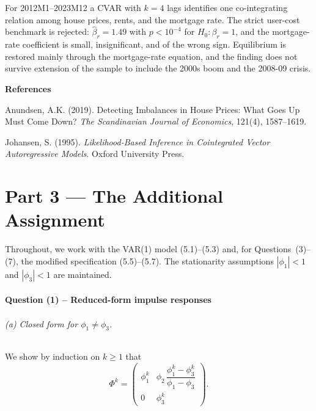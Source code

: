 \documentclass[12pt]{article}
\begin{document}
For 2012M1--2023M12 a CVAR with $k=4$ lags identifies one co-integrating relation among house prices, rents, and the mortgage rate. The strict user-cost benchmark is rejected: $\hat\beta_r=1.49$ with $p<10^{-4}$ for $H_0:\beta_r=1$, and the mortgage-rate coefficient is small, insignificant, and of the wrong sign. Equilibrium is restored mainly through the mortgage-rate equation, and the finding does not survive extension of the sample to include the 2000s boom and the 2008-09 crisis.

\bigskip
\noindent\textbf{References}

\noindent Anundsen, A.K. (2019). Detecting Imbalances in House Prices: What Goes Up Must Come Down? \textit{The Scandinavian Journal of Economics}, 121(4), 1587--1619.

\noindent Johansen, S. (1995). \textit{Likelihood-Based Inference in Cointegrated Vector Autoregressive Models}. Oxford University Press.


\newpage
\part{Part 3 --- The Additional Assignment}
\setcounter{section}{0}
\setcounter{figure}{0}
\setcounter{table}{0}
\setcounter{equation}{0}
\renewcommand{\thefigure}{3.\arabic{figure}}
\renewcommand{\thetable}{3.\arabic{table}}
\renewcommand{\theequation}{3.\arabic{equation}}

Throughout, we work with the VAR(1) model (5.1)--(5.3) and, for Questions~(3)--(7), the modified specification (5.5)--(5.7). The stationarity assumptions $|\phi_1|<1$ and $|\phi_3|<1$ are maintained.

\subsection*{Question (1) -- Reduced-form impulse responses}\label{sec:p3-q1}

\paragraph{(a) Closed form for $\phi_1\neq\phi_3$.} We show by induction on $k\geq 1$ that
\begin{equation}
\Phi^{k}=\begin{pmatrix} \phi_1^{k} & \phi_2\,\dfrac{\phi_1^{k}-\phi_3^{k}}{\phi_1-\phi_3} \\[4pt] 0 & \phi_3^{k}\end{pmatrix}. \label{eq:Phik}
\end{equation}
\end{document}
